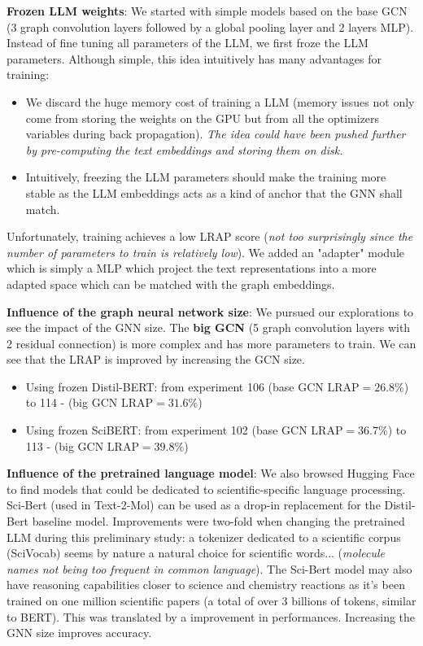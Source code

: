 \textbf{Frozen LLM weights}: We started with simple models based on the base GCN (3 graph convolution layers followed by a global pooling layer and 2 layers MLP). Instead of fine tuning all parameters of the LLM, we first froze the LLM parameters. Although simple, this idea intuitively has many advantages for training:
\begin{itemize}
    \item We discard the huge memory cost of training a LLM (memory issues not only come from storing the weights on the GPU but from all the optimizers variables during back propagation). \textit{The idea could have been pushed further by pre-computing the text embeddings and storing them on disk.}
    \item Intuitively, freezing the LLM parameters should make the training more stable as the LLM embeddings acts as a kind of anchor that the GNN shall match.
\end{itemize}
Unfortunately, training achieves a low LRAP score (\textit{not too surprisingly since the number of parameters to train is relatively low}). We added an "adapter" module which is simply a MLP which project the text representations into a more adapted space which can be matched with the graph embeddings.

\textbf{Influence of the graph neural network size}: We pursued our explorations to see the impact of the GNN size. The \textbf{big GCN} (5 graph convolution layers with 2 residual connection) is more complex and has more parameters to train. We can see that the LRAP is improved by increasing the GCN size. 
\begin{itemize}
    \item Using frozen Distil-BERT: from experiment 106 (base GCN $\text{LRAP}=26.8\%$) to 114 - (big GCN $\text{LRAP}=31.6\%$)
    \item Using frozen SciBERT: from experiment 102 (base GCN $\text{LRAP}=36.7\%$) to 113 - (big GCN $\text{LRAP}=39.8\%$)
\end{itemize}


\textbf{Influence of the pretrained language model}: We also browsed Hugging Face to find models that could be dedicated to scientific-specific language processing. Sci-Bert\cite{scibert} (used in Text-2-Mol\cite{text2mol}) can be used as a drop-in replacement for the Distil-Bert baseline model. Improvements were two-fold when changing the pretrained LLM during this preliminary study: a tokenizer dedicated to a scientific corpus (SciVocab) seems by nature a natural choice for scientific words... (\textit{molecule names not being too frequent in common language}). The Sci-Bert model may also have reasoning capabilities closer to science and chemistry reactions as it's been trained on one million scientific papers (a total of over 3 billions of tokens, similar to BERT). This was translated by a improvement in performances. Increasing the GNN size improves accuracy.

